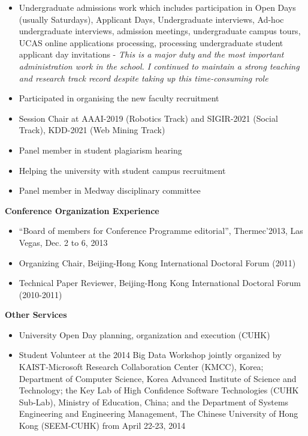 \documentclass[margin]{res}
\begin{document}
\begin{resume}
\begin{itemize}
\item Undergraduate admissions work which includes participation in Open Days (usually Saturdays), Applicant Days, Undergraduate interviews, Ad-hoc undergraduate interviews, admission meetings, undergraduate campus tours, UCAS online applications processing, processing undergraduate student applicant day invitations - \textit{This is a major duty and the most important administration work in the school. I continued to maintain a strong teaching and research track record despite taking up this time-consuming role}\\
\item Participated in organising the new faculty recruitment \\
\item Session Chair at AAAI-2019 (Robotics Track) and SIGIR-2021 (Social Track), KDD-2021 (Web Mining Track) \\
\item Panel member in student plagiarism hearing\\
\item Helping the university with student campus recruitment\\
\item Panel member in Medway disciplinary committee
\end{itemize}
\textbf{Conference Organization Experience}
\begin{itemize}\itemsep -10pt
\item ``Board of members for Conference Programme editorial'', Thermec'2013, Las Vegas, Dec. 2 to 6, 2013\\
\item Organizing Chair, Beijing-Hong Kong International Doctoral Forum (2011)\\
\item Technical Paper Reviewer, Beijing-Hong Kong International Doctoral Forum (2010-2011)
\end{itemize}
\textbf{Other Services}
\begin{itemize}\itemsep -10pt
\item University Open Day planning, organization and execution (CUHK)\\
\item Student Volunteer at the 2014 Big Data Workshop jointly organized by KAIST-Microsoft Research Collaboration Center (KMCC), Korea; Department of Computer Science, Korea Advanced Institute of Science and Technology; the Key Lab of High Confidence Software Technologies (CUHK Sub-Lab), Ministry of Education, China; and the Department of Systems Engineering and Engineering Management, The Chinese University of Hong Kong (SEEM-CUHK) from April 22-23, 2014\\

\end{itemize}
\end{resume}
\end{document}
